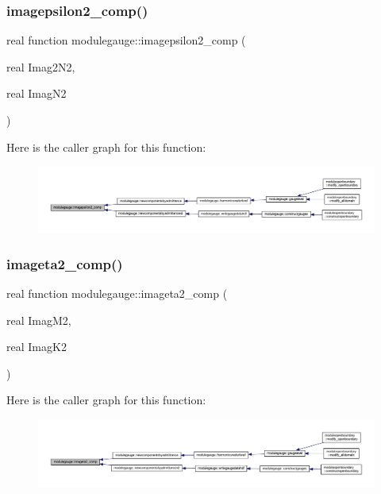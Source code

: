 \subsubsection{\texorpdfstring{imagepsilon2\+\_\+comp()}{imagepsilon2\_comp()}}
{\footnotesize\ttfamily real function modulegauge\+::imagepsilon2\+\_\+comp (\begin{DoxyParamCaption}\item[{real}]{Imag2\+N2,  }\item[{real}]{Imag\+N2 }\end{DoxyParamCaption})\hspace{0.3cm}{\ttfamily [private]}}

Here is the caller graph for this function\+:\nopagebreak
\begin{figure}[H]
\begin{center}
\leavevmode
\includegraphics[width=350pt]{namespacemodulegauge_a28b6b5b37157cb9ca35800eacb09e7fc_icgraph}
\end{center}
\end{figure}
\mbox{\label{namespacemodulegauge_a86cfe6d4e8801b4ade2414988f7586a7}} 
\subsubsection{\texorpdfstring{imageta2\+\_\+comp()}{imageta2\_comp()}}
{\footnotesize\ttfamily real function modulegauge\+::imageta2\+\_\+comp (\begin{DoxyParamCaption}\item[{real}]{Imag\+M2,  }\item[{real}]{Imag\+K2 }\end{DoxyParamCaption})\hspace{0.3cm}{\ttfamily [private]}}

Here is the caller graph for this function\+:\nopagebreak
\begin{figure}[H]
\begin{center}
\leavevmode
\includegraphics[width=350pt]{namespacemodulegauge_a86cfe6d4e8801b4ade2414988f7586a7_icgraph}
\end{center}
\end{figure}
\mbox{\label{namespacemodulegauge_af198ff90d25c103ae0c6ea8dc688ac4f}} 
